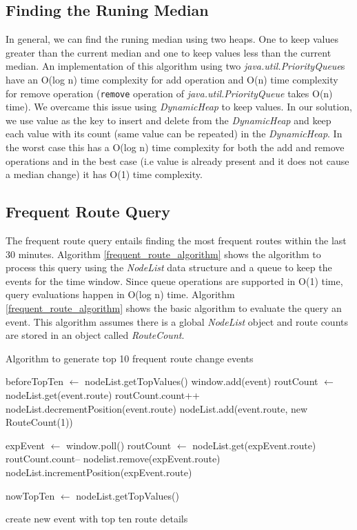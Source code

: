 \subsection{Finding the Runing Median}
In general, we can find the runing median using two heaps. One to keep values greater than the current median and one to keep values less than the current median. An implementation of this algorithm using two \textit{java.util.PriorityQueue}s have an O(log n) time complexity for add operation and O(n) time complexity for remove operation (\texttt{remove} operation of \textit{java.util.PriorityQueue} takes O(n) time).  We overcame this issue using \textit{DynamicHeap} to keep values. In our solution, we use value as the key to insert and delete from the \textit{DynamicHeap} and keep each value with its count (same value can be repeated) in the \textit{DynamicHeap}. In the worst case this has a O(log n) time complexity for both the add and remove operations and in the best case (i.e value is already present and it does not cause a median change) it has O(1) time complexity.

\subsection{Frequent Route Query}

The frequent route query entails finding the most frequent routes within the last 30 minutes. Algorithm \ref{frequent_route_algorithm} shows the algorithm to process this query using the \textit{NodeList} data structure and a queue to keep the events for the time window.  Since queue operations are supported in O(1) time, query evaluations happen in O(log n) time. Algorithm \ref{frequent_route_algorithm} shows the basic algorithm to evaluate the query an event. This algorithm assumes there is a global \textit{NodeList} object and route counts are stored in an object called \textit{RouteCount}. 

\begin{algorithm}
\caption{Algorithm to generate top 10 frequent route change events}
\label{frequent_route_algorithm}
\begin{algorithmic}
\small 
\STATE beforeTopTen $\leftarrow$ nodeList.getTopValues() 
\STATE window.add(event) 
	\STATE routCount $\leftarrow$ nodeList.get(event.route) 
	\STATE routCount.count++ 
	\STATE nodeList.decrementPosition(event.route) 
\ELSE
	\STATE nodeList.add(event.route, new RouteCount(1)) 
\ENDIF

	\STATE  expEvent $\leftarrow$ window.poll() 
	\STATE  routCount $\leftarrow$ nodeList.get(expEvent.route)
	\STATE  routCount.count-- 
		\STATE nodelist.remove(expEvent.route)
	\ELSE
		\STATE nodeList.incrementPosition(expEvent.route) 
	\ENDIF
\ENDWHILE

\STATE nowTopTen $\leftarrow$ nodeList.getTopValues() 

	\STATE create new event with top ten route details 
\ENDIF

\end{algorithmic}
\end{algorithm}

